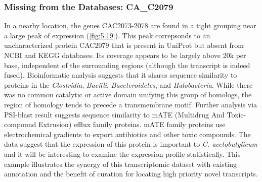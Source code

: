 \subsubsection{Missing from the Databases: CA_C2079}

In a nearby location, the genes CAC2073-2078 are found in a tight grouping near a large peak of expression (\ref{fig:5.19}). This peak correpsonds to an uncharacterized protein CAC2079 that is present in UniProt but absent from NCBI and KEGG databases. Its coverage appears to be largely above 20k per base, independent of the surrounding regions (although the transcript is indeed fused). Bioinformatic analysis suggests that it shares sequence similarity to proteins in the \textit{Clostridia}, \textit{Bacilli}, \textit{Baceteroidetes}, and \textit{Halobacteria}. While there was no common catalytic or active domain unifying this group of homologs, the region of homology tends to precede a transmembrane motif. Further analysis via PSI-blast result suggests sequence similarity to mATE (Multidrug And Toxic-compound Extrusion) efflux family proteins. mATE family proteins use electrochemical gradients to export antibiotics and other toxic compounds. The data suggest that the expression of this protein is important to \textit{C. acetobutylicum} and it will be interesting to examine the expression profile statistically. This example illustrates the synergy of this transcriptomic dataset with existing annotation and the benefit of curation for locating high priority novel transcripts.


 

